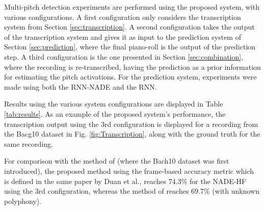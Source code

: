 Multi-pitch detection experiments are performed using the proposed system, with various configurations. A first configuration only considers the transcription system from Section \ref{sec:transcription}. A second configuration takes the output of the transcription system and gives it as input to the prediction system of Section \ref{sec:prediction}, where the final piano-roll is the output of the prediction step. A third configuration is the one presented in Section \ref{sec:combination}, where the recording is re-transcribed, having the prediction as a prior information for estimating the pitch activations. For the prediction system, experiments were made using both the RNN-NADE and the RNN.

Results using the various system configurations are displayed in Table \ref{tab:results}. As an example of the proposed system's performance, the transcription output using the 3rd configuration is displayed for a recording from the Bacg10 dataset in Fig. \ref{fig:Transcription}, along with the ground truth for the same recording.

For comparison with the method of \cite{Duan2010} (where the Bach10 dataset was first introduced), the proposed method using the frame-based accuracy metric which is defined in the same paper by Duan et al., reaches 74.3\% for the NADE-HF using the 3rd configuration, whereas the method of \cite{Duan2010} reaches 69.7\% (with unknown polyphony).

\begin{table}[t]
 \begin{center}
\end{center}
 \caption{Transcription results using various system configurations.}
 \label{tab:results}
\end{table}

